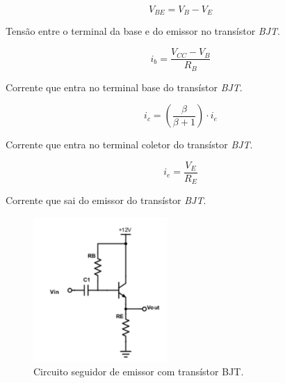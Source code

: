 \documentclass{article}
\begin{document}
    \begin{eqfloat}[h!]
        \begin{equation}
            V_{BE} = V_B - V_E
            \label{eq:Vbe}
        \end{equation}
        \caption{Tensão entre o terminal da base e do emissor no transístor \emph{BJT}.}
    \end{eqfloat}
    
    \begin{eqfloat}[h!]
        \begin{equation}
            i_b = \frac{V_{CC} - V_B}{R_B}
            \label{eq:Ib}
        \end{equation}
        \caption{Corrente que entra no terminal base do transístor \emph{BJT}.}
    \end{eqfloat}
    
    \begin{eqfloat}[h!]
        \begin{equation}
            i_c = (\frac{\beta}{\beta + 1}) \cdot i_e
            \label{eq:Ic}
        \end{equation}
        \caption{Corrente que entra no terminal coletor do transístor \emph{BJT}.}
    \end{eqfloat}
    
    \begin{eqfloat}[h!]
        \begin{equation}
            i_e = \frac{V_E}{R_E}
            \label{eq:Ie}
        \end{equation}
        \caption{Corrente que sai do emissor do transístor \emph{BJT}.}
    \end{eqfloat}
    
    
    
    \begin{figure}[h!]
        \centering
        \includegraphics[height=5.5cm]{imgSource/circuitolab4.png}
        \caption{Circuito seguidor de emissor com transístor BJT.}
        \label{fig:circLab4}
    \end{figure}
    
\end{document}
